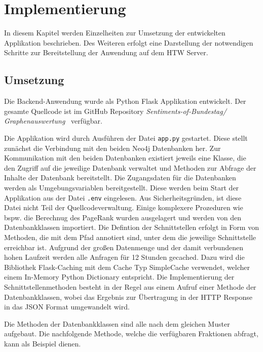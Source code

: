 \section{Implementierung}\label{sec:07_04_implementierung}
In diesem Kapitel werden Einzelheiten zur Umsetzung der entwickelten Applikation beschrieben.
Des Weiteren erfolgt eine Darstellung der notwendigen Schritte zur Bereitstellung der Anwendung auf dem HTW Server.

\subsection{Umsetzung}
Die Backend-Anwendung wurde als Python Flask Applikation entwickelt. Der gesamte Quellcode ist im GitHub Repository \textit{Sentiments-of-Bundestag/ Graphenauswertung}~\cite{github_graphenauswertung} verfügbar.

Die Applikation wird durch Ausführen der Datei \lstinline{app.py} gestartet.
Diese stellt zunächst die Verbindung mit den beiden Neo4j Datenbanken her.
Zur Kommunikation mit den beiden Datenbanken existiert jeweils eine Klasse, die den Zugriff auf die jeweilige Datenbank verwaltet und Methoden zur Abfrage der Inhalte der Datenbank bereitstellt.
Die Zugangsdaten für die Datenbanken werden als Umgebungsvariablen bereitgestellt. Diese werden beim Start der Applikation aus der Datei \lstinline{.env} eingelesen.
Aus Sicherheitsgründen, ist diese Datei nicht Teil der Quellcodeverwaltung.
Einige komplexere Prozeduren wie bspw. die Berechnug des PageRank wurden ausgelagert und werden von den Datenbankklassen importiert.
Die Defintion der Schnittstellen erfolgt in Form von Methoden, die mit dem Pfad annotiert sind, unter dem die jeweilige Schnittstelle erreichbar ist.
Aufgrund der großen Datenmenge und der damit verbundenen hohen Laufzeit werden alle Anfragen für 12 Stunden gecached.
Dazu wird die Bibliothek Flask-Caching mit dem Cache Typ SimpleCache verwendet, welcher einem In-Memory Python Dictionary entspricht.\cite{flask_caching}
Die Implementierung der Schnittstellenmethoden besteht in der Regel aus einem Aufruf einer Methode der Datenbankklassen, wobei das Ergebnis zur Übertragung in der HTTP Response in das JSON Format umgewandelt wird.

Die Methoden der Datenbankklassen sind alle nach dem gleichen Muster aufgebaut.
Die nachfolgende Methode, welche die verfügbaren Fraktionen abfragt, kann als Beispiel dienen.

